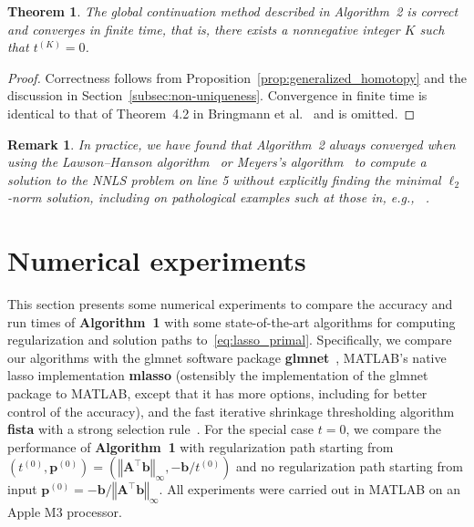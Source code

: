 \documentclass[11pt]{article}
\numberwithin{prop}{section}
\numberwithin{lem}{section}
\newtheorem{rem}{Remark}[section]
\numberwithin{rem}{section}
\numberwithin{cor}{section}
\newtheorem{thm}{Theorem}[section]
\numberwithin{thm}{section}
\numberwithin{defn}{section}
\numberwithin{fact}{section}
\theoremstyle{plain}
\def\bb {\boldsymbol{b}}
\def\bp {\boldsymbol{p}}
\newcommand{\norminf}[1]{\left\Vert{#1} \right\Vert_{\infty}}
\newcommand{\matr}[1]{\bm{#1}}
\def\Atop {\matr{A}^{\top}}
\begin{document}
\begin{thm}\label{thm:classical_homotopy}
The global continuation method described in Algorithm~2 is correct and converges in finite time, that is, there exists a nonnegative integer $K$ such that $t^{(K)} = 0$.
\end{thm}
\begin{proof}
Correctness follows from Proposition~\ref{prop:generalized_homotopy} and the discussion in Section~\ref{subsec:non-uniqueness}. Convergence in finite time is identical to that of Theorem~4.2 in Bringmann et al.~\cite{bringmann2018homotopy} and is omitted.
\end{proof}
\begin{rem}\label{rem:homotopy_convergence}
In practice, we have found that Algorithm~2 always converged when using the Lawson--Hanson algorithm~\cite{lawson1995solving} or Meyers's algorithm~\cite{meyer2013simple} to compute a solution to the NNLS problem on line 5 without explicitly finding the minimal $\ell_{2}$-norm solution, including on pathological examples such at those in, e.g., ~\cite{mairal2012complexity,bringmann2018homotopy}.
\end{rem}
\section{Numerical experiments}\label{sec:numerics}
This section presents some numerical experiments to compare the accuracy and run times of \textbf{Algorithm~1} with some state-of-the-art algorithms for computing regularization and solution paths to~\eqref{eq:lasso_primal}. Specifically, we compare our algorithms with the glmnet software package \textbf{glmnet}~\cite{tibshirani1996regression,zou2005regularization,friedman2010regularization,hastie2021glmnet}, MATLAB's native lasso implementation \textbf{mlasso} (ostensibly the implementation of the glmnet package to MATLAB, except that it has more options, including for better control of the accuracy), and the fast iterative shrinkage thresholding algorithm \textbf{fista} with a strong selection rule~\cite{beck2009fast,ghaoui2010safe,tibshirani2012strong,raj2016screening}. For the special case $t=0$, we compare the performance of \textbf{Algorithm~1} with regularization path starting from $(t^{(0)},\bp^{(0)}) = (\norminf{\Atop\bb}, -\bb/t^{(0)})$ and no regularization path starting from input $\bp^{(0)} = -\bb/\norminf{\Atop\bb}$. All experiments were carried out in MATLAB on an Apple M3 processor. 
\end{document}
